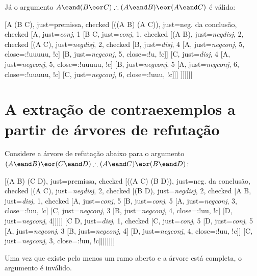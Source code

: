 Já o argumento $A \eand (B \eor C) \therefore (A \eand B) \eor (A \eand C)$ é válido:

\begin{center}
\begin{tableau}
	{
}
	[A \eand (B \eor C), just={premissa}, checked
	[\enot((A \eand B) \eor (A \eand C)), just={neg. da conclusão}, checked
	[A, just={\emph{conj}, 1}
	[B \eor C, just={\emph{conj}, 1}, checked
	[\enot (A \eand B), just={\emph{negdisj}, 2}, checked
	[\enot (A \eand C), just={\emph{negdisj}, 2}, checked
		[B, just={\emph{disj}, 4}
			[\enot A, just={\emph{negconj}, 5}, close={:!uuuuu, !c}]
			[\enot B, just={\emph{negconj}, 5}, close={:!u, !c}]]
		[C, just={\emph{disj}, 4}
			[\enot A, just={\emph{negconj}, 5}, close={:!uuuuu, !c}]
			[\enot B, just={\emph{negconj}, 5}
				[\enot A, just={\emph{negconj}, 6}, close={:!uuuuu, !c}]
				[\enot C, just={\emph{negconj}, 6}, close={:!uuu, !c}]]]
		]]]]]]
\end{tableau}
\end{center}

\section{A extração de contraexemplos a partir de árvores de refutação}

Considere a árvore de refutação abaixo para o argumento $(A \eand B) \eor (C \eand D) \therefore (A \eand C) \eor (B \eand D)$:
\begin{center}
\begin{tableau}
	{
	}
	[(A \eand B) \eor (C \eand D), just={premissa}, checked
	[\enot((A \eand C) \eor (B \eand D)), just={neg. da conclusão}, checked
	[\enot(A \eand C), just={\emph{negdisj}, 2}, checked
	[\enot(B \eand D), just={\emph{negdisj}, 2}, checked
		[A \eand B, just={\emph{disj}, 1}, checked
			[A, just={\emph{conj}, 5}
			[B, just={\emph{conj}, 5}
			[\enot A, just={\emph{negconj}, 3}, close={:!uu, !c}]
			[\enot C, just={\emph{negconj}, 3}
				[\enot B, just={\emph{negconj}, 4}, close={:!uu, !c}]
				[\enot D, just={\emph{negconj}, 4}]]]]]
		[C \eand D, just={\emph{disj}, 1}, checked
			[C, just={\emph{conj}, 5}
			[D, just={\emph{conj}, 5}
				[\enot A, just={\emph{negconj}, 3}
					[\enot B, just={\emph{negconj}, 4}]
					[\enot D, just={\emph{negconj}, 4}, close={:!uu, !c}]]
				[\enot C, just={\emph{negconj}, 3}, close={:!uu, !c}]]]]]]]]
\end{tableau}
\end{center}		
Uma vez que existe pelo menos um ramo aberto e a árvore está completa, o argumento é inválido.

